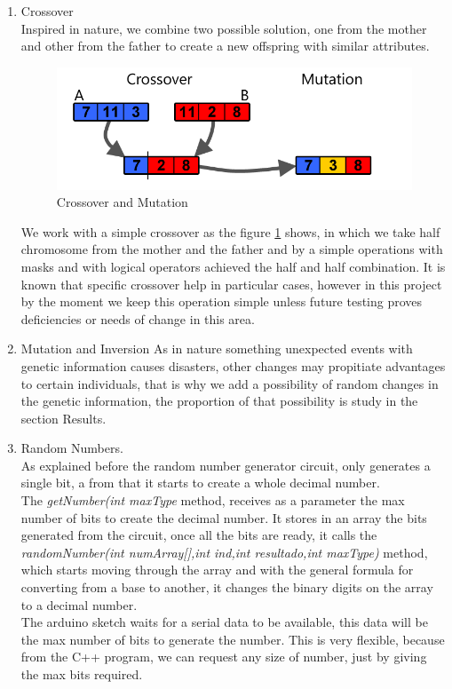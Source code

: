 \documentclass[twocolumn]{IEEEtran}
\begin{document}
\begin{enumerate}
        
    \item Crossover\\
    	Inspired in nature, we combine two possible solution, one from the mother and other from the 
        father to create a new offspring with similar attributes. \cite{4} \cite{5} \cite{7}
	    \begin{figure}[h!]
        \centering
        \includegraphics[width=\columnwidth]{src/crossover_mutation.png}
		\caption{Crossover and Mutation}
        \label{fig:crossover}
		\end{figure}
        We work with a simple crossover as the figure \ref{fig:crossover} shows, in which we take half 
        chromosome from the mother and the father and by a simple operations with masks and with 
        logical operators achieved the half and half combination. It is known that specific crossover
        help in particular cases, however in this project by the moment we keep this operation simple
        unless future testing proves deficiencies or needs of change in this area. 
        
        
    \item Mutation and Inversion
   	As in nature something unexpected events with genetic information causes disasters, other changes 
    may propitiate advantages to certain individuals, that is why we add a possibility of random changes
    in the genetic information, the proportion of that possibility is study in the section Results.\\
    
    
    \item Random Numbers.\\
    
    As explained before the random number generator circuit, only generates a single bit, a from that it starts to create a whole decimal number.\\
    The \textit{getNumber(int maxType} method, receives as a parameter the max number of bits to create the decimal number. It stores in an array the bits generated from the circuit, once all the bits are ready, it calls the \textit{randomNumber(int numArray[],int ind,int resultado,int maxType)} method, which starts moving through the array and with the general formula for converting from a base to another, it changes the binary digits on the array to a decimal number.\\
    The arduino sketch waits for a serial data to be available, this data will be the max number of bits to generate the number. This is very flexible, because from the C++ program, we can request any size of number, just by giving the max bits required.
    

\end{enumerate}
\end{document}
